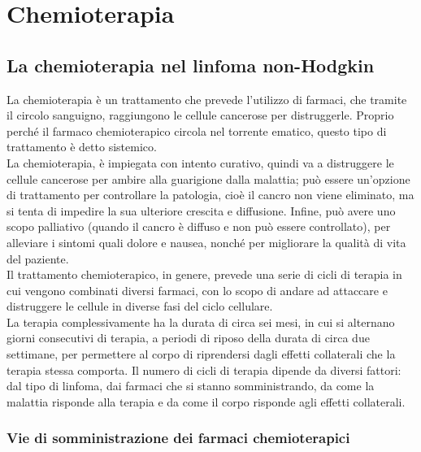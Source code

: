 \chapter{Chemioterapia}

\section{La chemioterapia nel linfoma non-Hodgkin}

La chemioterapia è un trattamento che prevede l’utilizzo di farmaci, che tramite il 
circolo sanguigno, raggiungono le cellule cancerose per distruggerle\cite{CHEMOUK}.
Proprio perché il farmaco chemioterapico circola nel torrente ematico, questo tipo di trattamento è detto sistemico.\\ 
La chemioterapia, è impiegata con intento curativo, quindi va a distruggere le cellule cancerose per ambire alla 
guarigione dalla malattia; può essere un’opzione di trattamento per controllare la patologia, cioè il cancro non 
viene eliminato, ma si tenta di impedire la sua ulteriore crescita e diffusione. Infine, può avere uno scopo 
palliativo (quando il cancro è diffuso e non può essere controllato), per alleviare 
i sintomi quali dolore e nausea, nonché per migliorare la qualità di vita del paziente\cite{CHEMOAMERICAN}.\\
Il trattamento chemioterapico, in genere, prevede una serie di cicli di terapia in cui vengono combinati diversi 
farmaci, con lo scopo di andare ad attaccare e distruggere le cellule in diverse fasi del ciclo cellulare\cite{LYMPHACTION}.\\
La terapia complessivamente ha la durata di circa sei mesi, in cui si alternano giorni consecutivi di terapia, 
a periodi di riposo della durata di circa due settimane, per permettere al corpo di riprendersi dagli effetti 
collaterali che la terapia stessa comporta. Il numero di cicli di terapia dipende da diversi fattori: dal tipo di 
linfoma, dai farmaci che si stanno somministrando, da come la malattia risponde alla terapia e
da come il corpo risponde agli effetti collaterali\cite{CHEMOUK}.

\subsection{Vie di somministrazione dei farmaci chemioterapici}

